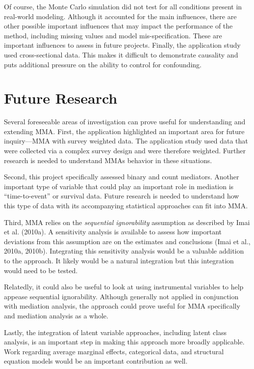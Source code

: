 \documentclass[]{DissertateUSU}
\begin{document}
Of course, the Monte Carlo simulation did not test for all conditions
present in real-world modeling. Although it accounted for the main
influences, there are other possible important influences that may
impact the performance of the method, including missing values and model
mis-specification. These are important influences to assess in future
projects. Finally, the application study used cross-sectional data. This
makes it difficult to demonstrate causality and puts additional pressure
on the ability to control for confounding.

\section{Future Research}\label{future-research}

Several foreseeable areas of investigation can prove useful for
understanding and extending MMA. First, the application highlighted an
important area for future inquiry---MMA with survey weighted data. The
application study used data that were collected via a complex survey
design and were therefore weighted. Further research is needed to
understand MMAs behavior in these situations.

Second, this project specifically assessed binary and count mediators.
Another important type of variable that could play an important role in
mediation is ``time-to-event'' or survival data. Future research is
needed to understand how this type of data with its accompanying
statistical approaches can fit into MMA.

Third, MMA relies on the \emph{sequential ignorability} assumption as
described by Imai et al. (2010a). A sensitivity analysis is available to
assess how important deviations from this assumption are on the
estimates and conclusions (Imai et al., 2010a, 2010b). Integrating this
sensitivity analysis would be a valuable addition to the approach. It
likely would be a natural integration but this integration would need to
be tested.

Relatedly, it could also be useful to look at using instrumental
variables to help appease sequential ignorability. Although generally
not applied in conjunction with mediation analysis, the approach could
prove useful for MMA specifically and mediation analysis as a whole.

Lastly, the integration of latent variable approaches, including latent
class analysis, is an important step in making this approach more
broadly applicable. Work regarding average marginal effects, categorical
data, and structural equation models would be an important contribution
as well.
\end{document}
